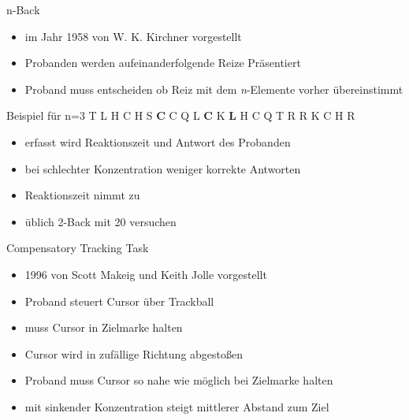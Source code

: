 \begin{frame}{n-Back}
	\begin{itemize}[<+->]
	\item im Jahr 1958 von W. K. Kirchner vorgestellt
	\item Probanden werden aufeinanderfolgende Reize Präsentiert
	\item Proband muss entscheiden ob Reiz mit dem \textit{n}-Elemente vorher übereinstimmt
	\end{itemize}
	\pause
	\begin{block}{Beispiel für n=3}
		T L H C H S \textbf{C} C Q L \textbf{C} K \textbf{L} H C Q T R R K C H R
	\end{block}
	\pause
	\begin{itemize}[<+->]
	\item erfasst wird Reaktionszeit und Antwort des Probanden
	\item bei schlechter Konzentration weniger korrekte Antworten 
	\item Reaktionszeit nimmt zu
	\item üblich 2-Back mit 20 versuchen
	\end{itemize}
\end{frame}
\begin{frame}{Compensatory Tracking Task}
	\begin{itemize}[<+->]
	\item 1996 von Scott Makeig und Keith Jolle vorgestellt
	\item Proband steuert Cursor über Trackball
	\item muss Cursor in Zielmarke halten
	\item Cursor wird in zufällige Richtung abgestoßen
	\item Proband muss Cursor so nahe wie möglich bei Zielmarke halten
	\item mit sinkender Konzentration steigt mittlerer Abstand zum Ziel
	\end{itemize}
\end{frame}